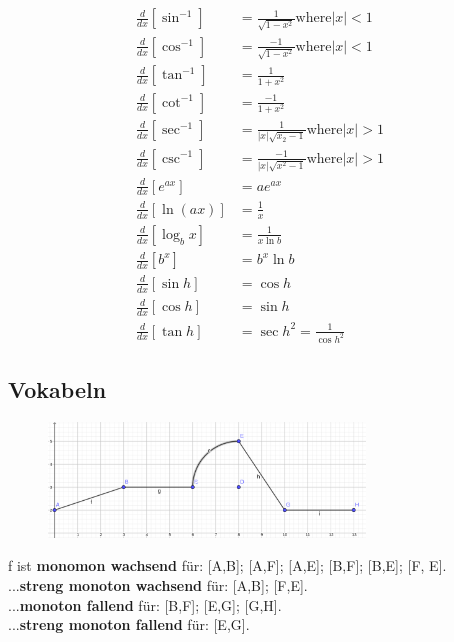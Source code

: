 \documentclass{report}
\begin{document}
\begin{align*}
    \frac{d}{dx}\left[\sin^{-1}\right]&= \frac{1}{\sqrt{1-x^2}} \text{where} |x|<1\\
    \frac{d}{dx}\left[\cos^{-1}\right]&= \frac{-1}{\sqrt{1-x^2}} \text{where} |x|<1 \\
    \frac{d}{dx}\left[\tan^{-1}\right]&=\frac{1}{1+x^2}  \\
    \frac{d}{dx}\left[\cot^{-1}\right]&= \frac{-1}{1+x^2} \\
    \frac{d}{dx}\left[\sec^{-1}\right]&=\frac{1}{|x|\sqrt{x_2-1}} \text{where} |x|>1\\
    \frac{d}{dx}\left[\csc^{-1}\right]&= \frac{-1}{|x|\sqrt{x^2-1}} \text{where} |x|>1 \\
    \frac{d}{dx}\left[e^{ax}\right]&= ae^{ax} \\
    \frac{d}{dx}\left[\ln(ax)\right]&= \frac{1}{x} \\
    \frac{d}{dx}\left[\log_bx\right]&= \frac{1}{x \ln b} \\
    \frac{d}{dx}\left[b^x\right]&= b^x \ln b \\
    \frac{d}{dx}\left[\sin h\right]&= \cos h \\
    \frac{d}{dx}\left[\cos h\right]&= \sin h \\
    \frac{d}{dx}\left[\tan h\right]&= \sec h^2= \frac{1}{\cos h^{2}}
\end{align*}

\subsection{Vokabeln}
\begin{figure}[htpb]
  \begin{center}
    \includegraphics[width=0.75\textwidth]{math-figures/mon.png}
  \end{center}
\end{figure}

f ist \textbf{monomon wachsend} für: [A,B]; [A,F]; [A,E]; [B,F]; [B,E]; [F, E].\\ 
...\textbf{streng monoton wachsend} für: [A,B]; [F,E].\\  
...\textbf{monoton fallend} für: [B,F]; [E,G]; [G,H].\\
...\textbf{streng monoton fallend} für: [E,G].
\end{document}
